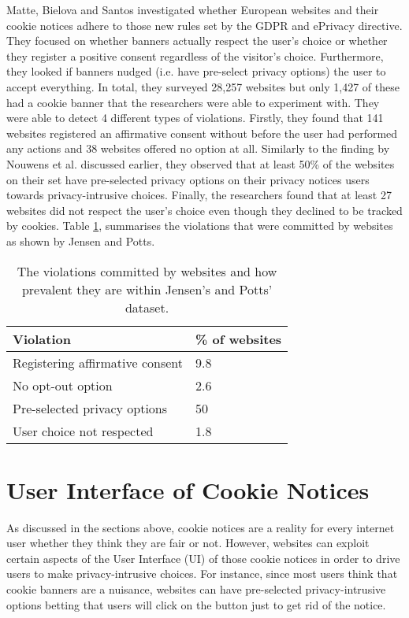 \documentclass[../main.tex]{subfiles}
\begin{document}
Matte, Bielova and Santos \cite{matte2019cookie} investigated whether European websites and their cookie notices adhere to those new rules set by the GDPR and ePrivacy directive. They focused on whether banners actually respect the user’s choice or whether they register a positive consent regardless of the visitor’s choice. Furthermore, they looked if banners nudged (i.e. have pre-select privacy options) the user to accept everything. In total, they surveyed 28,257 websites but only 1,427 of these had a cookie banner that the researchers were able to experiment with. They were able to detect 4 different types of violations. Firstly, they found that 141 websites registered an affirmative consent without before the user had performed any actions and 38 websites offered no  option at all. Similarly to the finding by Nouwens et al. discussed earlier, they observed that at least 50\% of the websites on their set have pre-selected privacy options on their privacy notices  users towards privacy-intrusive choices. Finally, the researchers found that at least 27 websites did not respect the user’s choice even though they declined to be tracked by cookies. Table \ref{tab:matte}, summarises the violations that were committed by websites as shown by Jensen and Potts. 

\begin{table}[ht]
    \centering
    \begin{tabular}{@{}ll@{}}
        \toprule
        \textbf{Violation}           & \textbf{\% of websites} \\ \midrule
        Registering affirmative consent & 9.8                     \\
        No opt-out option            & 2.6                     \\
        Pre-selected privacy options & 50                      \\
        User choice not respected    & 1.8                     \\ \bottomrule
    \end{tabular}
    \caption{The violations committed by websites and how prevalent they are within Jensen's and Potts' dataset.}
    \label{tab:matte}
\end{table}

\section{User Interface of Cookie Notices}
As discussed in the sections above, cookie notices are a reality for every internet user whether they think they are fair or not. However, websites can exploit certain aspects of the User Interface (UI) of those cookie notices in order to drive users to make privacy-intrusive choices. For instance, since most users think that cookie banners are a nuisance, websites can have pre-selected privacy-intrusive options betting that users will click on the  button just to get rid of the notice. 
\end{document}
